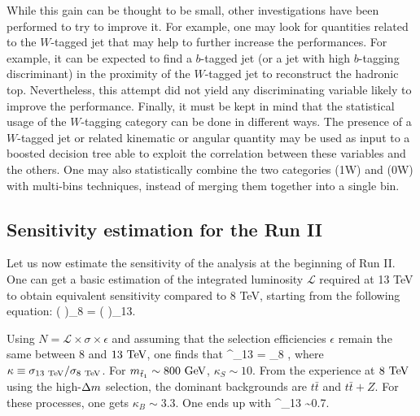     While this gain can be thought to be small, other investigations have been
    performed to try to improve it.
    For example, one may look for quantities related to the $W$-tagged jet that may help to further
    increase the performances. For example, it can be expected to find a $b$-tagged
    jet (or a jet with high $b$-tagging discriminant) in the proximity of the $W$-tagged
    jet to reconstruct the hadronic top. Nevertheless, this attempt did not yield
    any discriminating variable likely to improve the performance.
    Finally, it must be kept in mind that the statistical usage of the $W$-tagging
    category can be done in different ways. The presence of a $W$-tagged jet or
    related kinematic or angular quantity may be used as input to a boosted decision
    tree able to exploit the correlation between these variables and the others.
    One may also statistically combine the two categories (1W) and (0W) with multi-bins
    techniques, instead of merging them together into a single bin.

    \subsection{Sensitivity estimation for the Run II}

    Let us now estimate the sensitivity of the analysis at the beginning of Run II.
    One can get a basic estimation of the integrated luminosity $\mathcal{L}$ required
    at 13 TeV to obtain equivalent sensitivity compared to 8 TeV, starting from the
    following equation:
    {
        \left(
        \right)_{8\TeV}
        =
        \left(
        \right)_{13\TeV}.
    }

    Using $N = \mathcal{L} \times \sigma \times \epsilon$ and assuming that the selection
    efficiencies $\epsilon$ remain the same between $8$ and $13~\text{TeV}$, one finds that
    {
        ^_{13\TeV}
        =
        _{8\TeV}
        \times
        ,
    }
    where $\kappa \equiv \sigma_{13~\text{TeV}} / \sigma_{8~\text{TeV}}$. For $m_{\tilde{t}_1} \sim 800~\text{GeV}$,
    $\kappa_S \sim 10$. From the experience at $8~\text{TeV}$ using the high-$\Delta m$ selection,
    the dominant backgrounds are $t\bar{t}$ and $t\bar{t}+Z$. For these processes, one
    gets $\kappa_B \sim 3.3$. One ends up with
    {
        ^_{13\TeV} \sim 0.7\invfb.
    }


